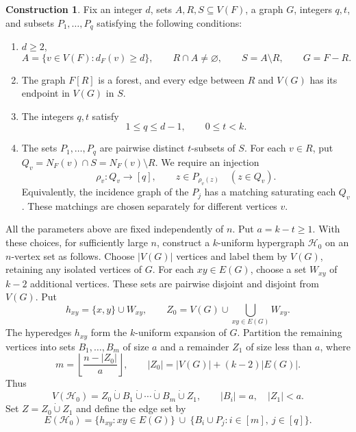 \documentclass[10pt,a4paper]{article}
\numberwithin{equation}{section}
\theoremstyle{definition}
\newtheorem{construction}[theorem]{Construction}
\theoremstyle{plain}
\newcommand{\HH}{\mathcal H}
\newcommand{\disj}{\mathbin{\dot\cup}}
\begin{document}
\begin{construction}\label{con:initial}
Fix an integer $d$, sets $A,R,S\subseteq V(F)$, a graph $G$,
integers $q,t$, and subsets $P_1,\ldots,P_q$ satisfying the following
conditions:
\begin{enumerate}[label=\arabic*.,leftmargin=*,itemsep=.4\baselineskip]
\item $d\ge2$,
\[
 A=\{v\in V(F):d_F(v)\ge d\},\qquad R\cap A\ne\varnothing,
 \qquad S=A\setminus R,\qquad G=F-R.
\]
\item The graph $F[R]$ is a forest, and every edge between $R$ and
$V(G)$ has its endpoint in $V(G)$ in $S$.
\item The integers $q,t$ satisfy
\begin{equation}\label{eq:parameters} 
  1\le q\le d-1,\qquad 0\le t<k.
\end{equation}
\item The sets $P_1,\ldots,P_q$ are pairwise distinct $t$-subsets of $S$.
For each $v\in R$, put $Q_v=N_F(v)\cap S=N_F(v)\setminus R$.
We require an injection
\begin{equation}\label{eq:matching}
 \rho_v:Q_v\longrightarrow[q],\qquad
 z\in P_{\rho_v(z)}\quad(z\in Q_v).
\end{equation}
Equivalently, the incidence graph of the $P_j$ has a matching
saturating each $Q_v$. These matchings are chosen separately for
different vertices $v$.
\end{enumerate}
All the parameters above are fixed independently of $n$.
Put $a=k-t\ge1$. With these choices, for sufficiently large $n$,
construct a $k$-uniform hypergraph $\HH_0$ on an $n$-vertex set
as follows. Choose $|V(G)|$ vertices and label them by $V(G)$,
retaining any isolated vertices of $G$. For each $xy\in E(G)$,
choose a set $W_{xy}$ of $k-2$
additional vertices. These sets are pairwise disjoint and disjoint
from $V(G)$. Put
\[
 h_{xy}=\{x,y\}\cup W_{xy},\qquad
 Z_0=V(G)\cup\bigcup_{xy\in E(G)}W_{xy}.
\]
The hyperedges $h_{xy}$ form the $k$-uniform expansion of $G$.
Partition the remaining vertices into sets $B_1,\ldots,B_m$
of size $a$ and a remainder $Z_1$ of size less than $a$, where
\[
 m=\left\lfloor\frac{n-|Z_0|}{a}\right\rfloor,
 \qquad |Z_0|=|V(G)|+(k-2)|E(G)|.
\]
Thus
\[
 V(\HH_0)
 =Z_0\disj B_1\disj\cdots\disj B_m\disj Z_1,
 \qquad |B_i|=a,\quad |Z_1|<a.
\]
Set $Z=Z_0\disj Z_1$ and define the edge set by
\begin{equation}\label{eq:construction}
 E(\HH_0)
 =\{h_{xy}:xy\in E(G)\}
 \ \cup\ \{B_i\cup P_j:i\in[m],\ j\in[q]\}.
\end{equation}
\end{construction}
\end{document}
